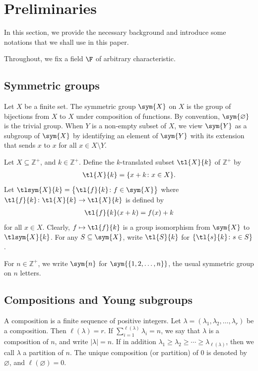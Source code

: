 \section{Preliminaries}

In this section, we provide the necessary background and introduce some notations that we shall use in this paper.

Throughout, we fix a field $\F$ of arbitrary characteristic.

\subsection{Symmetric groups}

Let $X$ be a finite set. The symmetric group $\sym{X}$ on $X$ is the group of bijections from $X$ to $X$ under composition of functions. By convention, $\sym{\varnothing}$ is the trivial group. When $Y$ is a non-empty subset of $X$, we view $\sym{Y}$ as a subgroup of $\sym{X}$ by identifying an element of $\sym{Y}$ with its extension that sends $x$ to $x$ for all $x \in X \setminus Y$.

Let $X \subseteq \mathbb{Z}^+$, and $k \in \mathbb{Z}^+$. Define the $k$-translated subset $\tl{X}{k}$ of $\mathbb{Z}^+$ by
\begin{gather*}\tl{X}{k} = \{ x+ k\colon x \in X \}. \end{gather*}
Let $\tlsym{X}{k}=\big\{\tl{f}{k}\colon f\in\sym{X}\big\}$ where $\tl{f}{k}\colon \tl{X}{k}\to\tl{X}{k}$ is defined by
\begin{gather*}
\tl{f}{k}(x+k) = f(x) + k
\end{gather*}
for all $x \in X$. Clearly, $f \mapsto \tl{f}{k}$ is a group isomorphism from $\sym{X}$ to $\tlsym{X}{k}$. For any $S \subseteq \sym{X}$, write $\tl{S}{k}$ for $\{ \tl{s}{k}\colon s \in S\}$.

For $n \in \mathbb{Z}^+$, we write $\sym{n}$ for $\sym{\{1,2,\dotsc, n\}}$, the usual symmetric group on $n$ letters.

\subsection{Compositions and Young subgroups}

A composition is a finite sequence of positive integers. Let $\lambda = (\lambda_1,\lambda_2,\dotsc, \lambda_r)$ be a composition. Then $\ell(\lambda) = r$. If $\sum\limits_{i=1}^{\ell(\lambda)} \lambda_i = n$, we say that $\lambda$ is a composition of $n$, and write $|\lambda| = n$. If in addition $\lambda_1 \geq \lambda_2 \geq \dotsb \geq \lambda_{\ell(\lambda)}$, then we call $\lambda$ a partition of $n$. The unique composition (or partition) of 0 is denoted by $\varnothing$, and $\ell(\varnothing)=0$.

